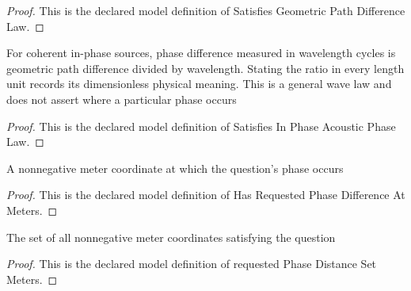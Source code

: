 \begin{proof}
  This is the declared model definition of Satisfies Geometric Path Difference Law.
\end{proof}
\begin{definition}
  \label{def:physics:phyx-mini-0316:phyxminiproblems-problemphyxmini0316-satisfiesinphaseacousticphaselaw}
  For coherent in-phase sources, phase difference measured in wavelength cycles is geometric path difference divided by wavelength. Stating the ratio in every length unit records its dimensionless physical meaning. This is a general wave law and does not assert where a particular phase occurs
\end{definition}
\begin{proof}
  This is the declared model definition of Satisfies In Phase Acoustic Phase Law.
\end{proof}
\begin{definition}
  \label{def:physics:phyx-mini-0316:phyxminiproblems-problemphyxmini0316-hasrequestedphasedifferenceatmeters}
  A nonnegative meter coordinate at which the question's phase occurs
\end{definition}
\begin{proof}
  This is the declared model definition of Has Requested Phase Difference At Meters.
\end{proof}
\begin{definition}
  \label{def:physics:phyx-mini-0316:phyxminiproblems-problemphyxmini0316-requestedphasedistancesetmeters}
  The set of all nonnegative meter coordinates satisfying the question
\end{definition}
\begin{proof}
  This is the declared model definition of requested Phase Distance Set Meters.
\end{proof}
